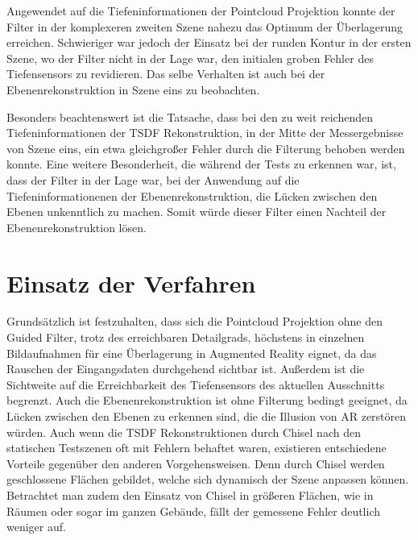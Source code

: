 Angewendet auf die Tiefeninformationen der Pointcloud Projektion konnte der Filter in der komplexeren zweiten Szene nahezu das Optimum der Überlagerung erreichen. Schwieriger war jedoch der Einsatz bei der runden Kontur in der ersten Szene, wo der Filter nicht in der Lage war, den initialen groben Fehler des Tiefensensors zu revidieren. Das selbe Verhalten ist auch bei der Ebenenrekonstruktion in Szene eins zu beobachten. 

Besonders beachtenswert ist die Tatsache, dass bei den zu weit reichenden Tiefeninformationen der TSDF Rekonstruktion, in der Mitte der Messergebnisse von Szene eins, ein etwa gleichgroßer Fehler durch die Filterung behoben werden konnte. Eine weitere Besonderheit, die während der Tests zu erkennen war, ist, dass der Filter in der Lage war, bei der Anwendung auf die Tiefeninformationenen der Ebenenrekonstruktion, die Lücken zwischen den Ebenen unkenntlich zu machen. Somit würde dieser Filter einen Nachteil der Ebenenrekonstruktion lösen.

\section{Einsatz der Verfahren}

Grundsätzlich ist festzuhalten, dass sich die Pointcloud Projektion ohne den Guided Filter, trotz des erreichbaren Detailgrads, höchstens in einzelnen Bildaufnahmen für eine Überlagerung in Augmented Reality eignet, da das Rauschen der Eingangsdaten durchgehend sichtbar ist. Außerdem ist die Sichtweite auf die Erreichbarkeit des Tiefensensors des aktuellen Ausschnitts begrenzt. Auch die Ebenenrekonstruktion ist ohne Filterung bedingt geeignet, da Lücken zwischen den Ebenen zu erkennen sind, die die Illusion von AR zerstören würden. Auch wenn die TSDF Rekonstruktionen durch Chisel nach den statischen Testszenen oft mit Fehlern behaftet waren, existieren entschiedene Vorteile gegenüber den anderen Vorgehensweisen. Denn durch Chisel werden geschlossene Flächen gebildet, welche sich dynamisch der Szene anpassen können. Betrachtet man zudem den Einsatz von Chisel in größeren Flächen, wie in Räumen oder sogar im ganzen Gebäude, fällt der gemessene Fehler deutlich weniger auf.\\

